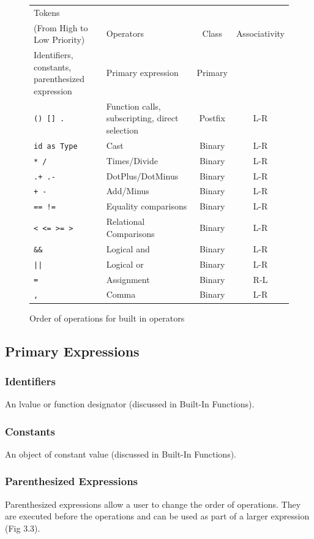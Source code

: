 \documentclass[12pt,A4]{book}
\begin{document}
\begin{figure}
\center
\begin{tabular}{|p{}|p{}|c|c|}
\hline
Tokens\\(From High to Low Priority) & Operators & Class & Associativity \\ \hline
Identifiers, constants, parenthesized expression & Primary expression & Primary	& \\ \hline
\verb|() [] .|	& Function calls, subscripting, direct selection & Postfix & L-R \\ \hline
\verb|id as Type| & Cast & Binary & L-R \\ \hline
\verb|* /| &	Times/Divide	& Binary &	L-R \\ \hline
\verb|.+ .-| &	DotPlus/DotMinus	& Binary &	L-R \\ \hline
\verb|+ -| &	Add/Minus	& Binary &	L-R \\ \hline
\verb|== !=| & Equality comparisons & Binary & L-R \\ \hline
\verb|< <= >= >| & Relational Comparisons & Binary & L-R \\ \hline
\verb|&&| &	Logical and	& Binary	& L-R \\ \hline
\verb.||.	& Logical or & Binary & L-R \\ \hline
\verb|=| &	Assignment  & 	Binary & R-L \\ \hline
\verb|,| & Comma & Binary & L-R \\ \hline
\end{tabular}
\label{fig:order_of_operations}
\caption{Order of operations for built in operators}
\end{figure}
\subsection{Primary Expressions}
\subsubsection{Identifiers}
An lvalue or function designator (discussed in Built-In Functions).
\subsubsection{Constants}
An object of constant value (discussed in Built-In Functions).
\subsubsection{Parenthesized Expressions}
Parenthesized expressions allow a user to change the order of operations. They are executed before the operations and can be used as part of a larger expression (Fig 3.3).
\end{document}
